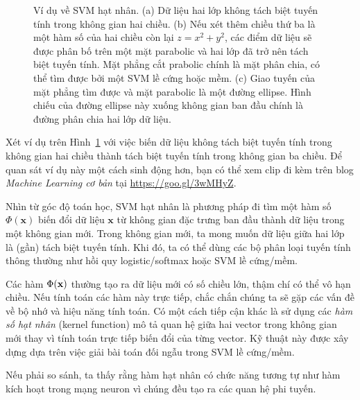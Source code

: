 \begin{figure}[t]
\caption{
Ví dụ về SVM hạt nhân. (a) Dữ liệu hai lớp không tách biệt tuyến tính trong không gian hai chiều. (b) Nếu xét thêm chiều thứ ba là một hàm số
của hai chiều còn lại $z = x^2 + y^2$, các điểm dữ liệu sẽ được phân bố trên
một mặt parabolic và hai lớp đã trở nên tách biệt tuyến tính. Mặt
phẳng cắt prabolic chính là mặt phân chia, có thể tìm được bởi một
SVM lề cứng hoặc mềm. (c) Giao tuyến của mặt phẳng tìm được và mặt
parabolic là một đường ellipse. Hình chiếu của đường ellipse này xuống không gian ban đầu chính là đường phân chia hai lớp dữ liệu.}
\label{fig:21_1}
\end{figure}
Xét ví dụ trên Hình~\ref{fig:21_1} với việc biến dữ liệu không tách biệt tuyến tính trong không gian hai chiều thành tách biệt tuyến tính trong
không gian ba chiều. Để quan sát ví dụ này
một cách sinh động hơn, bạn có thể xem clip đi kèm trên blog \textit{Machine
Learning cơ bản} tại \url{https://goo.gl/3wMHyZ}.


Nhìn từ góc độ toán học, SVM hạt nhân là phương pháp đi tìm một hàm số
$\Phi(\mathbf{x})$ biến đổi dữ liệu $\mathbf{x}$ từ không gian đặc trưng ban đầu
thành dữ liệu trong một không gian mới. Trong không gian mới, ta mong muốn dữ
liệu giữa hai lớp là (gần) tách biệt tuyến tính. Khi
đó, ta có thể dùng các bộ phân loại tuyến tính thông thường như hồi quy logistic/softmax hoặc SVM lề cứng/mềm.


Các hàm $\Phi(\mathbf{x})$ thường tạo ra dữ liệu mới có số chiều lớn, thậm chí có thể vô hạn chiều. Nếu tính toán các hàm này trực tiếp,
chắc chắn chúng ta sẽ gặp các vấn đề về bộ nhớ và hiệu năng tính toán. Có một
cách tiếp cận khác là sử dụng các \textit{hàm số hạt nhân} (kernel function) mô tả quan hệ giữa hai
vector trong không gian mới thay vì tính toán trực tiếp biến
đổi của từng vector. Kỹ thuật này được xây dựng dựa
trên việc giải bài toán đối ngẫu trong SVM lề cứng/mềm.


Nếu phải so sánh, ta thấy rằng hàm hạt nhân có chức năng
tương tự như hàm kích hoạt trong mạng neuron vì chúng đều tạo ra các quan hệ phi tuyến.
\newpage

